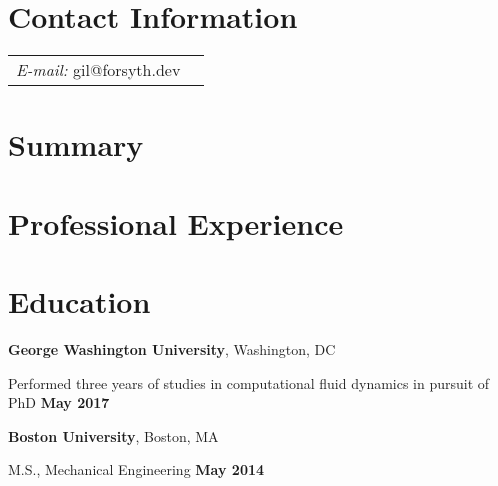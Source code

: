 \documentclass[margin,line]{res}
\newenvironment{list1}{
  \begin{list}{\ding{113}}{%
      \setlength{\itemsep}{0in}
      \setlength{\parsep}{0in} \setlength{\parskip}{0in}
      \setlength{\topsep}{0in} \setlength{\partopsep}{0in}
      \setlength{\leftmargin}{0.17in}}}{\end{list}}
\begin{document}
\newcommand{\link}[1]{\texttt{#1}}
\providecommand{\tightlist}{%
      \setlength{\itemsep}{0pt}\setlength{\parskip}{0pt}}


\renewcommand{\labelitemi}{\ding{226}}


\begin{resume}
\section{\sc Contact Information}
\vspace{.05in}
\begin{tabular}{@{}p{2in}p{4in}}
{\it E-mail:}  gil@forsyth.dev
\end{tabular}


\section{\sc Summary}



\section{\sc Professional Experience}






\section{\sc Education}
\textbf {George Washington University}, Washington, DC\\
\vspace*{-.1in}
\begin{list1}
\item[] Performed three years of studies in computational fluid dynamics in pursuit of PhD \hfill \textbf{ May 2017}
\end{list1}

\textbf {Boston University}, Boston, MA\\
\vspace*{-.1in}
\begin{list1}
\item[] M.S., Mechanical Engineering \hfill \textbf{ May 2014}
\end{list1}


\end{resume}
\end{document}
